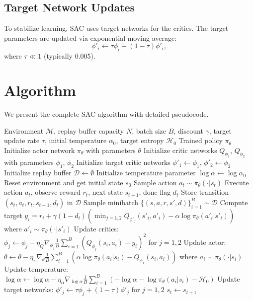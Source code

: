 \documentclass[conference]{IEEEtran}
\begin{document}
\subsection{Target Network Updates}
To stabilize learning, SAC uses target networks for the critics. The target parameters are updated via exponential moving average:
\begin{equation}
\phi'_i \leftarrow \tau \phi_i + (1 - \tau) \phi'_i,
\end{equation}
where $\tau \ll 1$ (typically 0.005).

\section{Algorithm}
We present the complete SAC algorithm with detailed pseudocode.

\begin{algorithm}[H]
\caption{Soft Actor-Critic (SAC) - Complete Implementation}
\label{alg:sac}
\begin{algorithmic}[1]
\Require Environment $\mathcal{M}$, replay buffer capacity $N$, batch size $B$, discount $\gamma$, target update rate $\tau$, initial temperature $\alpha_0$, target entropy $\mathcal{H}_0$
\Ensure Trained policy $\pi_\theta$
\State Initialize actor network $\pi_\theta$ with parameters $\theta$
\State Initialize critic networks $Q_{\phi_1}$, $Q_{\phi_2}$ with parameters $\phi_1$, $\phi_2$
\State Initialize target critic networks $\phi'_1 \leftarrow \phi_1$, $\phi'_2 \leftarrow \phi_2$
\State Initialize replay buffer $\mathcal{D} \leftarrow \emptyset$
\State Initialize temperature parameter $\log \alpha \leftarrow \log \alpha_0$
\State Reset environment and get initial state $s_0$
  \State Sample action $a_t \sim \pi_\theta(\cdot|s_t)$
  \State Execute action $a_t$, observe reward $r_t$, next state $s_{t+1}$, done flag $d_t$
  \State Store transition $(s_t, a_t, r_t, s_{t+1}, d_t)$ in $\mathcal{D}$
      \State Sample minibatch $\{(s, a, r, s', d)\}_{i=1}^B \sim \mathcal{D}$
      \State Compute target $y_i = r_i + \gamma (1 - d_i) \left( \min_{j=1,2} Q_{\phi'_j}(s'_i, a'_i) - \alpha \log \pi_\theta(a'_i|s'_i) \right)$ where $a'_i \sim \pi_\theta(\cdot|s'_i)$
      \State Update critics: $\phi_j \leftarrow \phi_j - \eta_Q \nabla_{\phi_j} \frac{1}{B} \sum_{i=1}^B (Q_{\phi_j}(s_i, a_i) - y_i)^2$ for $j = 1, 2$
      \State Update actor: $\theta \leftarrow \theta - \eta_\pi \nabla_\theta \frac{1}{B} \sum_{i=1}^B \left( \alpha \log \pi_\theta(a_i|s_i) - Q_{\phi_1}(s_i, a_i) \right)$ where $a_i \sim \pi_\theta(\cdot|s_i)$
      \State Update temperature: $\log \alpha \leftarrow \log \alpha - \eta_\alpha \nabla_{\log \alpha} \frac{1}{B} \sum_{i=1}^B \left( -\log \alpha - \log \pi_\theta(a_i|s_i) - \mathcal{H}_0 \right)$
      \State Update target networks: $\phi'_j \leftarrow \tau \phi_j + (1 - \tau) \phi'_j$ for $j = 1, 2$
    \EndFor
  \EndIf
  \State $s_t \leftarrow s_{t+1}$
\EndFor
\end{algorithmic}
\end{algorithm}
\end{document}
